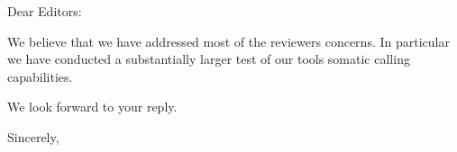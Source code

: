 \documentclass[10pt]{letter}
\begin{document}
\begin{letter}{}
\opening{Dear Editors:}

We believe that we have addressed most of the reviewers concerns. In particular we have conducted a substantially larger test of our tools somatic calling capabilities.



We look forward to your reply.

\closing{Sincerely,}

\end{letter}
\end{document}

